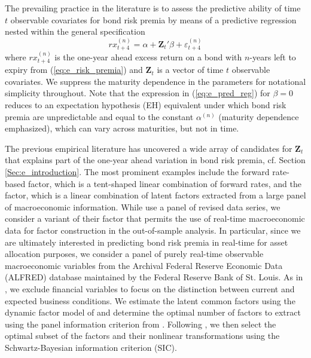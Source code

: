 \documentclass[12pt,letterpaper,leqno,doublespacing]{article}
\begin{document}
The prevailing practice in the literature is to assess the predictive ability of time $t$ observable covariates for bond risk premia by means of a predictive regression nested within the general specification
\begin{equation}
    rx_{t+4}^{\left(n\right)} = \alpha + \mathbf{Z}_{t}'\beta + \varepsilon_{t+4}^{\left(n\right)}
    \label{eq:e_pred_reg}
\end{equation}
where $rx_{t+4}^{\left(n\right)}$ is the one-year ahead excess return on a bond with $n$-years left to expiry from (\ref{eq:e_risk_premia}) and $\mathbf{Z}_{t}$ is a vector of time $t$ observable covariates. We suppress the maturity dependence in the parameters for notational simplicity throughout. Note that the expression in (\ref{eq:e_pred_reg}) for $\beta=0$ reduces to an expectation hypothesis (EH) equivalent under which bond risk premia are unpredictable and equal to the constant $\alpha^{\left(n\right)}$ (maturity dependence emphasized), which can vary across maturities, but not in time. 

The previous empirical literature has uncovered a wide array of candidates for $\mathbf{Z}_{t}$ that explains part of the one-year ahead variation in bond risk premia, cf. Section \ref{Sec:e_introduction}. The most prominent examples include the \cite{CochranePiazzesi2005} forward rate-based factor, which is a tent-shaped linear combination of forward rates, and the \cite{LudvigsonNg2009} factor, which is a linear combination of latent factors extracted from a large panel of macroeconomic information. While \cite{LudvigsonNg2009} use a panel of revised data series, we consider a variant of their factor that permits the use of real-time macroeconomic data for factor construction in the out-of-sample analysis. In particular, since we are ultimately interested in predicting bond risk premia in real-time for asset allocation purposes, we consider a panel of purely real-time observable macroeconomic variables from the Archival Federal Reserve Economic Data (ALFRED) database maintained by the Federal Reserve Bank of St. Louis. As in \cite{GhyselsHoranMoench2014}, we exclude financial variables to focus on the distinction between current and expected business conditions. We estimate the latent common factors using the dynamic factor model of \cite{StockWatson2002PC,StockWatson2002Diffusien} and determine the optimal number of factors to extract using the panel information criterion from \cite{BaiNg2002}. Following \cite{LudvigsonNg2009}, we then select the optimal subset of the factors and their nonlinear transformations using the Schwartz-Bayesian information criterion (SIC). 
\end{document}
